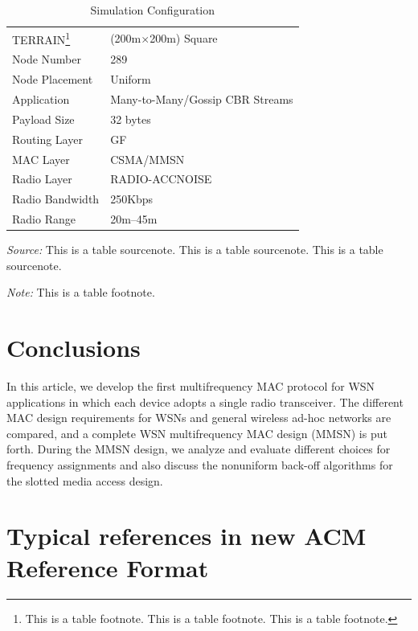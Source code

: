 \documentclass[format=acmsmall, review=false]{acmart}
\begin{document}
\begin{table}%
	\caption{Simulation Configuration}
	\label{tab:one}
	\begin{minipage}{\columnwidth}
		\begin{center}
			\begin{tabular}{ll}
				\toprule
				TERRAIN\footnote{This is a table footnote. This is a
					table footnote. This is a table footnote.}   & (200m$\times$200m) Square\\
				Node Number     & 289\\
				Node Placement  & Uniform\\
				Application     & Many-to-Many/Gossip CBR Streams\\
				Payload Size    & 32 bytes\\
				Routing Layer   & GF\\
				MAC Layer       & CSMA/MMSN\\
				Radio Layer     & RADIO-ACCNOISE\\
				Radio Bandwidth & 250Kbps\\
				Radio Range     & 20m--45m\\
				\bottomrule
			\end{tabular}
		\end{center}
		\bigskip\centering
		\footnotesize\emph{Source:} This is a table
		sourcenote. This is a table sourcenote. This is a table
		sourcenote.

		\emph{Note:} This is a table footnote.
	\end{minipage}
\end{table}%


\section{Conclusions}

In this article, we develop the first multifrequency MAC protocol for
WSN applications in which each device adopts a
single radio transceiver. The different MAC design requirements for
WSNs and general wireless ad-hoc networks are
compared, and a complete WSN multifrequency MAC design (MMSN) is
put forth. During the MMSN design, we analyze and evaluate different
choices for frequency assignments and also discuss the nonuniform
back-off algorithms for the slotted media access design.


\section{Typical references in new ACM Reference Format}
\end{document}
